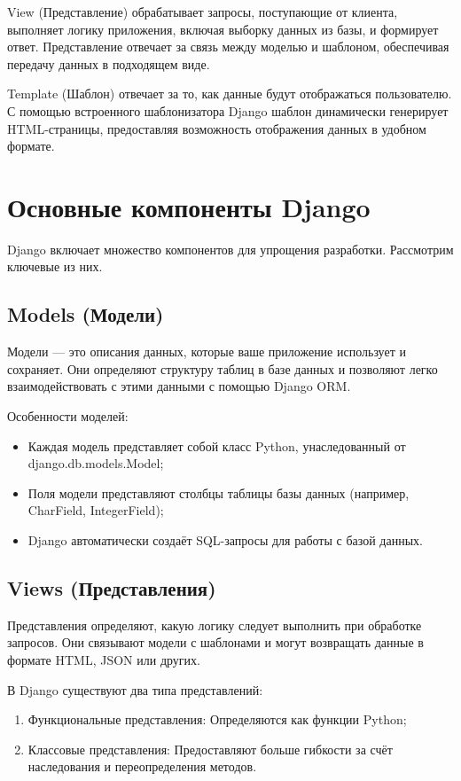 View (Представление) обрабатывает запросы, поступающие от клиента, выполняет логику приложения, включая выборку данных из базы, и формирует ответ. Представление отвечает за связь между моделью и шаблоном, обеспечивая передачу данных в подходящем виде.

Template (Шаблон) отвечает за то, как данные будут отображаться пользователю. С помощью встроенного шаблонизатора Django шаблон динамически генерирует HTML-страницы, предоставляя возможность отображения данных в удобном формате.

\section{Основные компоненты Django}
Django включает множество компонентов для упрощения разработки. Рассмотрим ключевые из них.
\subsection*{Models (Модели)}
Модели — это описания данных, которые ваше приложение использует и сохраняет. Они определяют структуру таблиц в базе данных и позволяют легко взаимодействовать с этими данными с помощью Django ORM.

Особенности моделей:
\begin{itemize}
    \item Каждая модель представляет собой класс Python, унаследованный от django.db.models.Model;
    \item Поля модели представляют столбцы таблицы базы данных (например, CharField, IntegerField);
    \item Django автоматически создаёт SQL-запросы для работы с базой данных.
\end{itemize}

\subsection*{Views (Представления)}
Представления определяют, какую логику следует выполнить при обработке запросов. Они связывают модели с шаблонами и могут возвращать данные в формате HTML, JSON или других.

В Django существуют два типа представлений:
\begin{enumerate}
    \item Функциональные представления: Определяются как функции Python;
    \item Классовые представления: Предоставляют больше гибкости за счёт наследования и переопределения методов.
\end{enumerate}

